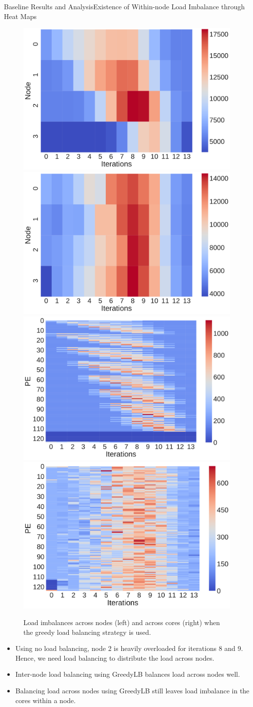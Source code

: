 \begin{frame}{Baseline Results and Analysis}{Existence of Within-node Load Imbalance through Heat Maps}
\begin{figure}[ht!]
\begin{center}
{\includegraphics[width=.25\columnwidth]{images/nolb_node_load_with_iter}}
{\includegraphics[width=0.25\columnwidth]{plots/greedylb_node_load_with_iter__2_.pdf}}\\
{\includegraphics[width=0.25\columnwidth]{images/nolb_pe_load_with_iter}}
{\includegraphics[width=0.25\columnwidth]{plots/greedylb_pe_load_with_iter}}
\end{center}
\caption{\label{fig:motexample2} \footnotesize Load imbalances across nodes (left) and across cores (right) when the greedy load balancing strategy is used.}
\end{figure}
\begin{itemize}
\tiny \item \tiny Using no load balancing, node 2 is heavily overloaded for iterations 8 and 9. Hence, we need load balancing to distribute the load across nodes.
\item \tiny Inter-node load balancing using GreedyLB balances load across nodes well.
\item \tiny Balancing load across nodes using GreedyLB still leaves load imbalance in the cores within a node.
\end{itemize}
\end{frame}

